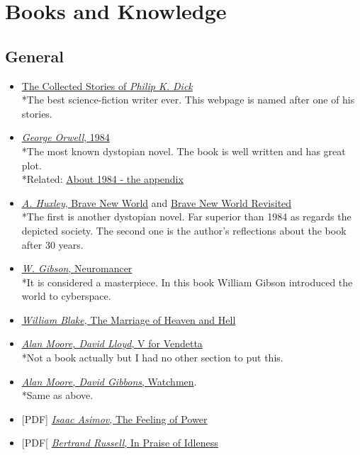 \documentclass{article}
\begin{document}
\section{Books and Knowledge}

\subsection{General}
\begin{itemize}
      \item \underline{The Collected Stories of \emph{Philip K. Dick}}
      \\*The best science-fiction writer ever. This webpage is named after one of his stories.
      
	\item \underline{\emph{George Orwell}, 1984}
      \\*The most known dystopian novel. The book is well written and has great plot.
      \\*Related: \href{http://qz.com/95696/you-probably-didnt-read-the-most-telling-part-of-orwells-1984-the-appendix/}{About 1984 - the appendix}
      
	\item \underline{\emph{A. Huxley}, Brave New World} and \underline{Brave New World Revisited}
      \\*The first is another dystopian novel. Far superior than 1984 as regards the depicted society. The second one is the author's reflections about the book after 30 years. 
      
	\item \underline{\emph{W. Gibson}, Neuromancer}
      \\*It is considered a masterpiece. In this book William Gibson introduced the world to cyberspace.
      
	\item \underline{\emph{William Blake}, The Marriage of Heaven and Hell}
      
	\item \underline{\emph{Alan Moore, David Lloyd}, V for Vendetta}
      \\*Not a book actually but I had no other section to put this.
      
	\item \underline{\emph{Alan Moore, David Gibbons}, Watchmen}.
	\\*Same as above.
      
	\item {[}PDF{]} \underline{\emph{Isaac Asimov}, \href{other/Asimov-Feeling.pdf}{The Feeling of Power}}
      
	\item {[}PDF{[} \underline{\emph{Bertrand Russell}, \href{other/Russell-Idleness.pdf}{In Praise of Idleness}}
\end{itemize}
\end{document}
